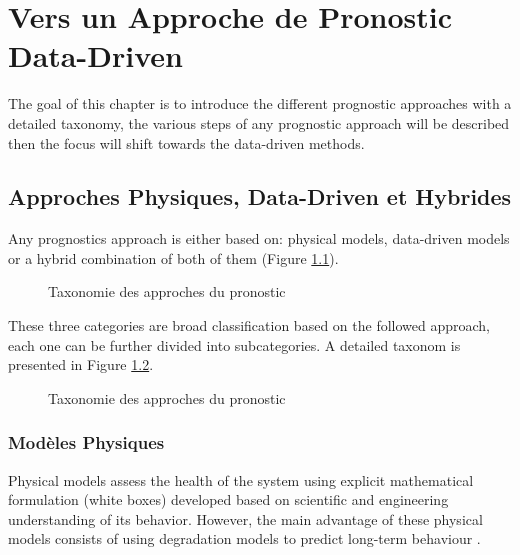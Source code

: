 \chapter{Vers un Approche de Pronostic Data-Driven}

\begin{chapterintro}
    The goal of this chapter is to introduce the different prognostic approaches with a detailed taxonomy, the various steps of any prognostic approach will be described then the focus will shift towards the data-driven methods.
\end{chapterintro}

\section{Approches Physiques, Data-Driven et Hybrides}

Any prognostics approach is either based on: physical models, data-driven models or a hybrid combination of both of them (Figure \ref{fig:prognostic-approaches-venn}).

\begin{figure}[h]
    \centering
	
    \caption{Taxonomie des approches du pronostic}
    \label{fig:prognostic-approaches-venn}
\end{figure}

These three categories are broad classification based on the followed approach, each one can be further divided into subcategories. A detailed taxonom is presented in Figure \ref{fig:prognostic-approaches-tree}.
\begin{figure}[H]
	\resizebox{\textwidth}{!}{}
    \caption{Taxonomie des approches du pronostic}
    \label{fig:prognostic-approaches-tree}
\end{figure}





\subsection{Modèles Physiques}
Physical models assess the health of the system using explicit mathematical formulation (white boxes) developed based on scientific and engineering understanding of its behavior. However, the main advantage of these physical models consists of using degradation models to predict long-term behaviour \cite{Cubillo2016}.

